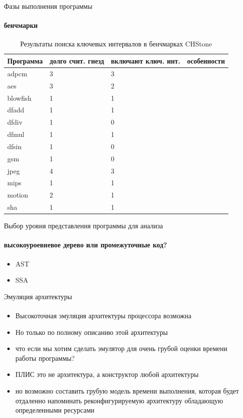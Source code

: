 \documentclass{beamer}              %
\begin{document}
\begin{frame}{Фазы выполнения программы}
  \framesubtitle{бенчмарки}
  \begin{table}
    \begin{tabular}{ | p{1.5cm} | p{2cm} | p{1cm} | p{6cm} |}
    \hline
    Программа & долго счит. гнезд & включают ключ. инт. & особенности \\ \hline
    adpcm & 3 & 3 &  \\ \hline
    aes & 3 & 2 &  \\ \hline
    blowfish & 1 & 1 &  \\ \hline
    dfadd & 1 & 1 &  \\ \hline
    dfdiv & 1 & 0 &  \\ \hline
    dfmul & 1 & 1 &  \\ \hline
    dfsin & 1 & 0 &  \\ \hline
    gsm & 1 & 0 &  \\ \hline
    jpeg & 4 & 3 & \\ \hline
    mips & 1 & 1 & \\ \hline
    motion & 2 & 1 &  \\ \hline
    sha & 1 & 1 &  \\ \hline
    \end{tabular} 
    \caption{Результаты поиска ключевых интервалов в бенчмарках CHStone}
    \label{table:CHStoneSimpoints}
\end{table}

\end{frame}

\begin{frame}{Выбор уровня представления программы для анализа}
  \framesubtitle{высокоуроевневое дерево или промежуточные код?}
  
  \begin{itemize}
      \item AST
      \item SSA
  \end{itemize}
  
\end{frame}

\begin{frame}{Эмуляция архитектуры}
  \framesubtitle{}
  
  \begin{itemize}
      \item Высокоточная эмуляция архитектуры процессора возможна
      \item Но только по полному описанию этой архитектуры
      \item что если мы хотим сделать эмулятор для очень грубой оценки времени работы программы?
      \item ПЛИС это не архитектура, а конструктор любой архитектуры
      \item но возможно составить грубую модель времени выполнения, которая будет отдаленно напоминать реконфигурируемую архитектуру обладающую определенными ресурсами
  \end{itemize}
  
\end{frame}
\end{document}

